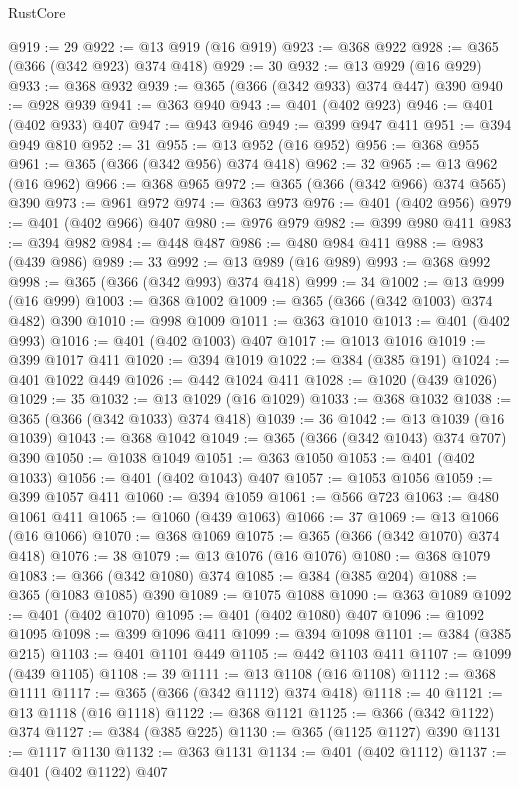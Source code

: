 \begin{lexlean}{RustCore}
\begin{coremodule}
@919 := 29
@922 := @13 @919 (@16 @919)
@923 := @368 @922
@928 := @365 (@366 (@342 @923) @374 @418)
@929 := 30
@932 := @13 @929 (@16 @929)
@933 := @368 @932
@939 := @365 (@366 (@342 @933) @374 @447) @390
@940 := @928 @939
@941 := @363 @940
@943 := @401 (@402 @923)
@946 := @401 (@402 @933) @407
@947 := @943 @946
@949 := @399 @947 @411
@951 := @394 @949 @810
@952 := 31
@955 := @13 @952 (@16 @952)
@956 := @368 @955
@961 := @365 (@366 (@342 @956) @374 @418)
@962 := 32
@965 := @13 @962 (@16 @962)
@966 := @368 @965
@972 := @365 (@366 (@342 @966) @374 @565) @390
@973 := @961 @972
@974 := @363 @973
@976 := @401 (@402 @956)
@979 := @401 (@402 @966) @407
@980 := @976 @979
@982 := @399 @980 @411
@983 := @394 @982
@984 := @448 @487
@986 := @480 @984 @411
@988 := @983 (@439 @986)
@989 := 33
@992 := @13 @989 (@16 @989)
@993 := @368 @992
@998 := @365 (@366 (@342 @993) @374 @418)
@999 := 34
@1002 := @13 @999 (@16 @999)
@1003 := @368 @1002
@1009 := @365 (@366 (@342 @1003) @374 @482) @390
@1010 := @998 @1009
@1011 := @363 @1010
@1013 := @401 (@402 @993)
@1016 := @401 (@402 @1003) @407
@1017 := @1013 @1016
@1019 := @399 @1017 @411
@1020 := @394 @1019
@1022 := @384 (@385 @191)
@1024 := @401 @1022 @449
@1026 := @442 @1024 @411
@1028 := @1020 (@439 @1026)
@1029 := 35
@1032 := @13 @1029 (@16 @1029)
@1033 := @368 @1032
@1038 := @365 (@366 (@342 @1033) @374 @418)
@1039 := 36
@1042 := @13 @1039 (@16 @1039)
@1043 := @368 @1042
@1049 := @365 (@366 (@342 @1043) @374 @707) @390
@1050 := @1038 @1049
@1051 := @363 @1050
@1053 := @401 (@402 @1033)
@1056 := @401 (@402 @1043) @407
@1057 := @1053 @1056
@1059 := @399 @1057 @411
@1060 := @394 @1059
@1061 := @566 @723
@1063 := @480 @1061 @411
@1065 := @1060 (@439 @1063)
@1066 := 37
@1069 := @13 @1066 (@16 @1066)
@1070 := @368 @1069
@1075 := @365 (@366 (@342 @1070) @374 @418)
@1076 := 38
@1079 := @13 @1076 (@16 @1076)
@1080 := @368 @1079
@1083 := @366 (@342 @1080) @374
@1085 := @384 (@385 @204)
@1088 := @365 (@1083 @1085) @390
@1089 := @1075 @1088
@1090 := @363 @1089
@1092 := @401 (@402 @1070)
@1095 := @401 (@402 @1080) @407
@1096 := @1092 @1095
@1098 := @399 @1096 @411
@1099 := @394 @1098
@1101 := @384 (@385 @215)
@1103 := @401 @1101 @449
@1105 := @442 @1103 @411
@1107 := @1099 (@439 @1105)
@1108 := 39
@1111 := @13 @1108 (@16 @1108)
@1112 := @368 @1111
@1117 := @365 (@366 (@342 @1112) @374 @418)
@1118 := 40
@1121 := @13 @1118 (@16 @1118)
@1122 := @368 @1121
@1125 := @366 (@342 @1122) @374
@1127 := @384 (@385 @225)
@1130 := @365 (@1125 @1127) @390
@1131 := @1117 @1130
@1132 := @363 @1131
@1134 := @401 (@402 @1112)
@1137 := @401 (@402 @1122) @407

\end{coremodule}
\end{lexlean}
